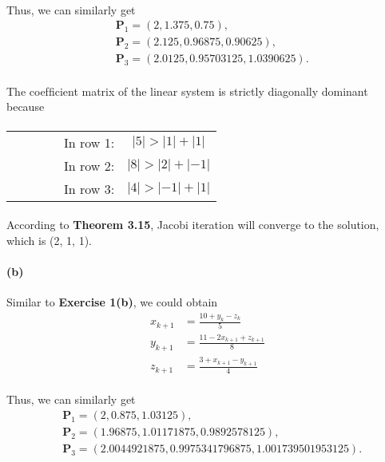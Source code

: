 \documentclass{article}  %
\begin{document}
        \paragraph{}Thus, we can similarly get
        \begin{align*}
            &\bm{P}_1 = (2, 1.375, 0.75),  \\
            &\bm{P}_2 = (2.125, 0.96875, 0.90625),  \\
            &\bm{P}_3 = (2.0125, 0.95703125, 1.0390625).
        \end{align*}
        \paragraph{}The coefﬁcient matrix of the linear system is strictly diagonally dominant because
        \paragraph{}
        \renewcommand\tabcolsep{12.0pt} %
        \begin{threeparttable} %
            \begin{tabular}{cccccc} 
             & & & & In row 1: & $|5| > |1| + |1|$ \\
             & & & & In row 2: & $|8| > |2| + |-1|$ \\
             & & & & In row 3: & $|4| > |-1| + |1|$ 
            \end{tabular} 
        \end{threeparttable}
        \paragraph{}According to \textbf{Theorem 3.15}, Jacobi iteration will converge to the solution, which is (2, 1, 1).
        \paragraph{(b)}Similar to \textbf{Exercise 1(b)}, we could obtain 
        \begin{align*}
            x_{k+1} &= \frac{10 + y_k - z_k}{5} \\
            y_{k+1} &= \frac{11 -2x_{k+1} + z_{k+1}}{8} \\
            z_{k+1} &= \frac{3 + x_{k+1} - y_{k+1}}{4}
        \end{align*}
        \paragraph{}Thus, we can similarly get
        \begin{align*}
            &\bm{P}_1 = (2, 0.875, 1.03125),  \\
            &\bm{P}_2 = (1.96875, 1.01171875, 0.9892578125),  \\
            &\bm{P}_3 = (2.0044921875, 0.9975341796875, 1.001739501953125).
        \end{align*}
\end{document}
